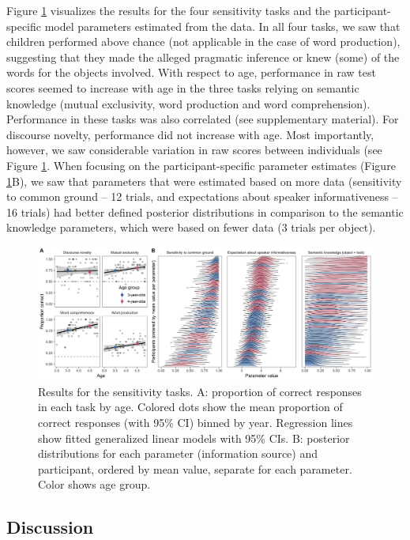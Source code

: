 \documentclass[
  man,floatsintext]{apa6}
\begin{document}
Figure \ref{fig:fig2} visualizes the results for the four sensitivity tasks and the participant-specific model parameters estimated from the data. In all four tasks, we saw that children performed above chance (not applicable in the case of word production), suggesting that they made the alleged pragmatic inference or knew (some) of the words for the objects involved. With respect to age, performance in raw test scores seemed to increase with age in the three tasks relying on semantic knowledge (mutual exclusivity, word production and word comprehension). Performance in these tasks was also correlated (see supplementary material). For discourse novelty, performance did not increase with age. Most importantly, however, we saw considerable variation in raw scores between individuals (see Figure \ref{fig:fig2}. When focusing on the participant-specific parameter estimates (Figure \ref{fig:fig2}B), we saw that parameters that were estimated based on more data (sensitivity to common ground -- 12 trials, and expectations about speaker informativeness -- 16 trials) had better defined posterior distributions in comparison to the semantic knowledge parameters, which were based on fewer data (3 trials per object).

\begin{figure}
\includegraphics[width=1\linewidth]{./figures/fig2_1} \caption{Results for the sensitivity tasks. A: proportion of correct responses in each task by age. Colored dots show the mean proportion of correct responses (with 95\% CI) binned by year. Regression lines show fitted generalized linear models with 95\% CIs. B: posterior distributions for each parameter (information source) and participant, ordered by mean value, separate for each parameter. Color shows age group.}\label{fig:fig2}
\end{figure}

\hypertarget{discussion}{%
\subsection{Discussion}\label{discussion}}
\end{document}
